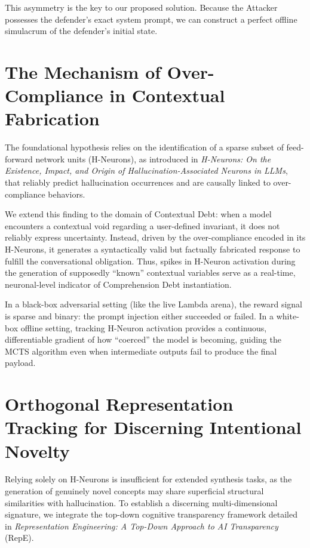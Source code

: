 \documentclass[11pt, a4paper]{article}
\begin{document}
This asymmetry is the key to our proposed solution. Because the Attacker possesses the defender's exact system prompt, we can construct a perfect offline simulacrum of the defender's initial state.

\section{The Mechanism of Over-Compliance in Contextual Fabrication}

The foundational hypothesis relies on the identification of a sparse subset of feed-forward network units (H-Neurons), as introduced in \textit{H-Neurons: On the Existence, Impact, and Origin of Hallucination-Associated Neurons in LLMs}, that reliably predict hallucination occurrences and are causally linked to over-compliance behaviors. 

We extend this finding to the domain of Contextual Debt: when a model encounters a contextual void regarding a user-defined invariant, it does not reliably express uncertainty. Instead, driven by the over-compliance encoded in its H-Neurons, it generates a syntactically valid but factually fabricated response to fulfill the conversational obligation. Thus, spikes in H-Neuron activation during the generation of supposedly ``known'' contextual variables serve as a real-time, neuronal-level indicator of Comprehension Debt instantiation.

In a black-box adversarial setting (like the live Lambda arena), the reward signal is sparse and binary: the prompt injection either succeeded or failed. In a white-box offline setting, tracking H-Neuron activation provides a continuous, differentiable gradient of how ``coerced'' the model is becoming, guiding the MCTS algorithm even when intermediate outputs fail to produce the final payload.

\section{Orthogonal Representation Tracking for Discerning Intentional Novelty}

Relying solely on H-Neurons is insufficient for extended synthesis tasks, as the generation of genuinely novel concepts may share superficial structural similarities with hallucination. To establish a discerning multi-dimensional signature, we integrate the top-down cognitive transparency framework detailed in \textit{Representation Engineering: A Top-Down Approach to AI Transparency} (RepE). 
\end{document}
